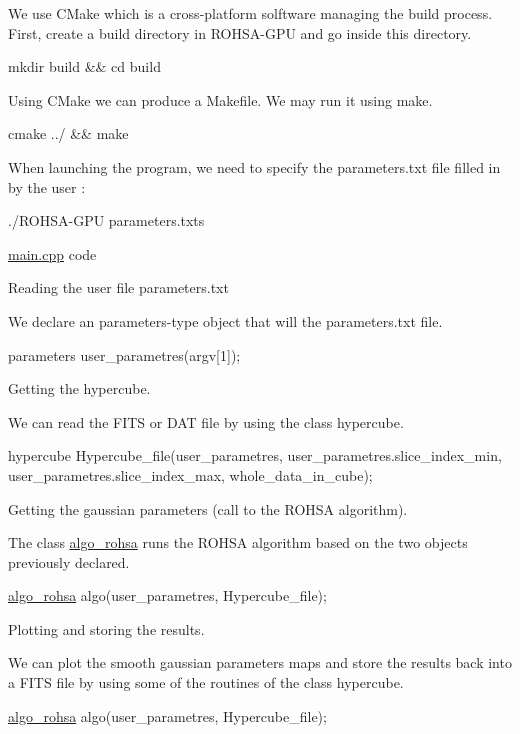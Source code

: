 We use C\+Make which is a cross-\/platform solftware managing the build process. First, create a build directory in R\+O\+H\+S\+A-\/\+G\+PU and go inside this directory.

mkdir build \&\& cd build

Using C\+Make we can produce a Makefile. We may run it using make.

cmake ../ \&\& make

When launching the program, we need to specify the parameters.\+txt file filled in by the user \+: ~\newline


./\+R\+O\+H\+S\+A-\/\+G\+PU parameters.\+txts

\mbox{\hyperlink{main_8cpp_source}{main.\+cpp}} code

Reading the user file parameters.\+txt

We declare an parameters-\/type object that will the parameters.\+txt file.

parameters user\+\_\+parametres(argv\mbox{[}1\mbox{]});

Getting the hypercube.

We can read the F\+I\+TS or D\+AT file by using the class hypercube.

hypercube Hypercube\+\_\+file(user\+\_\+parametres, user\+\_\+parametres.\+slice\+\_\+index\+\_\+min, user\+\_\+parametres.\+slice\+\_\+index\+\_\+max, whole\+\_\+data\+\_\+in\+\_\+cube);

Getting the gaussian parameters (call to the R\+O\+H\+SA algorithm).

The class \mbox{\hyperlink{classalgo__rohsa}{algo\+\_\+rohsa}} runs the R\+O\+H\+SA algorithm based on the two objects previously declared.

\mbox{\hyperlink{classalgo__rohsa}{algo\+\_\+rohsa}} algo(user\+\_\+parametres, Hypercube\+\_\+file);

Plotting and storing the results.

We can plot the smooth gaussian parameters maps and store the results back into a F\+I\+TS file by using some of the routines of the class hypercube.

\mbox{\hyperlink{classalgo__rohsa}{algo\+\_\+rohsa}} algo(user\+\_\+parametres, Hypercube\+\_\+file); 